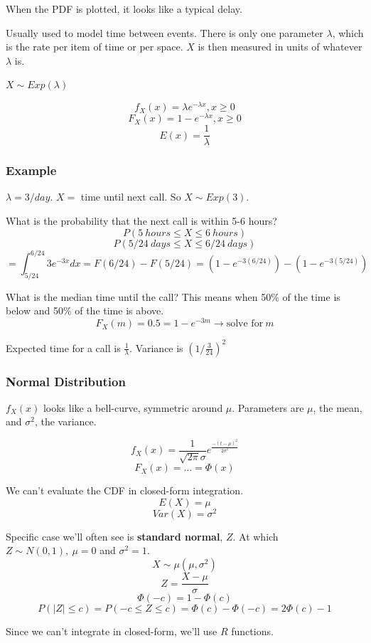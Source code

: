 \documentclass{report}
\newcommand{\var}{\sigma^2}
\begin{document}
When the PDF is plotted, it looks like a typical delay.

Usually used to model time between events. There is only one parameter $\lambda$, which is the rate per item of time or per space. $X$ is then measured in units of whatever $\lambda$ is.

$X \sim Exp(\lambda)$

$$f_X(x) = \lambda e^{-\lambda x}, x \geq 0$$
$$F_X(x) = 1-e^{-\lambda x}, x \geq 0$$
$$E(x) = \frac{1}{\lambda}$$


\subsubsection*{Example}

$\lambda = 3/day$. $X = $ time until next call. So $X \sim Exp(3)$.

What is the probability that the next call is within 5-6 hours? $$P(5\ hours \leq X \leq 6\ hours)$$ $$P(5/24\ days \leq X \leq 6/24\ days)$$
$$ = \int_{5/24}^{6/24} 3e^{-3x} dx = F(6/24) - F(5/24) = (1-e^{-3(6/24)}) - (1-e^{-3(5/24)}) $$

What is the median time until the call? This means when 50\% of the time is below and 50\% of the time is above. $$F_X(m) = 0.5 = 1-e^{-3m} \rightarrow \text{solve for}\ m$$

Expected time for a call is $\frac{1}{\lambda}$. Variance is $\left( 1/\frac{3}{24} \right)^2$ 

\subsubsection{Normal Distribution}

$f_X(x)$ looks like a bell-curve, symmetric around $\mu$. Parameters are $\mu$, the mean, and $\sigma^2$, the variance.

$$ f_X(x) = \frac{1}{\sqrt{2 \pi} \sigma} e^{\frac{-(t-\mu)^2}{2 \sigma^2}}$$ $$F_X(x) = \dots = \Phi(x)$$ 

We can't evaluate the CDF in closed-form integration.
$$E(X) = \mu$$ $$Var(X) = \sigma^2$$

Specific case we'll often see is \textbf{standard normal}, $Z$. At which $Z \sim N(0,1),\ \mu=0$ and $\sigma^2=1$.
$$ X \sim \mu(\mu, \var)$$ $$ Z = \frac{X-\mu}{\sigma}$$
$$\Phi(-c) = 1-\Phi(c)$$
$$P(|Z|\leq c) = P(-c \leq Z \leq c) = \Phi(c) - \Phi(-c) = 2\Phi(c) -1 $$ 

Since we can't integrate in closed-form, we'll use $R$ functions.
\end{document}
